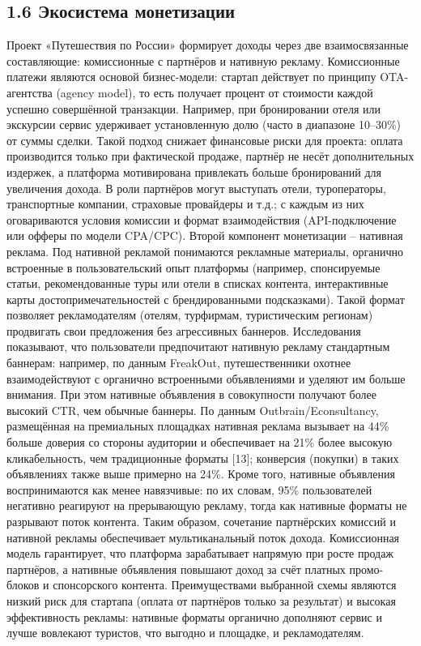 \subsection*{1.6 Экосистема монетизации}
Проект «Путешествия по России» формирует доходы через две взаимосвязанные составляющие: комиссионные с партнёров и нативную рекламу. Комиссионные платежи являются основой бизнес-модели: стартап действует по принципу OTA-агентства (agency model), то есть получает процент от стоимости каждой успешно совершённой транзакции. Например, при бронировании отеля или экскурсии сервис удерживает установленную долю (часто в диапазоне 10–30\%) от суммы сделки. Такой подход снижает финансовые риски для проекта: оплата производится только при фактической продаже, партнёр не несёт дополнительных издержек, а платформа мотивирована привлекать больше бронирований для увеличения дохода. В роли партнёров могут выступать отели, туроператоры, транспортные компании, страховые провайдеры и т.д.; с каждым из них оговариваются условия комиссии и формат взаимодействия (API-подключение или офферы по модели CPA/CPC). Второй компонент монетизации – нативная реклама. Под нативной рекламой понимаются рекламные материалы, органично встроенные в пользовательский опыт платформы (например, спонсируемые статьи, рекомендованные туры или отели в списках контента, интерактивные карты достопримечательностей с брендированными подсказками). Такой формат позволяет рекламодателям (отелям, турфирмам, туристическим регионам) продвигать свои предложения без агрессивных баннеров. Исследования показывают, что пользователи предпочитают нативную рекламу стандартным баннерам: например, по данным FreakOut, путешественники охотнее взаимодействуют с органично встроенными объявлениями и уделяют им больше внимания. При этом нативные объявления в совокупности получают более высокий CTR, чем обычные баннеры. По данным Outbrain/Econsultancy, размещённая на премиальных площадках нативная реклама вызывает на 44\% больше доверия со стороны аудитории и обеспечивает на 21\% более высокую кликабельность, чем традиционные форматы [13]; конверсия (покупки) в таких объявлениях также выше примерно на 24\%. Кроме того, нативные объявления воспринимаются как менее навязчивые: по их словам, 95\% пользователей негативно реагируют на прерывающую рекламу, тогда как нативные форматы не разрывают поток контента. Таким образом, сочетание партнёрских комиссий и нативной рекламы обеспечивает мультиканальный поток дохода. Комиссионная модель гарантирует, что платформа зарабатывает напрямую при росте продаж партнёров, а нативные объявления повышают доход за счёт платных промо-блоков и спонсорского контента. Преимуществами выбранной схемы являются низкий риск для стартапа (оплата от партнёров только за результат) и высокая эффективность рекламы: нативные форматы органично дополняют сервис и лучше вовлекают туристов, что выгодно и площадке, и рекламодателям.


